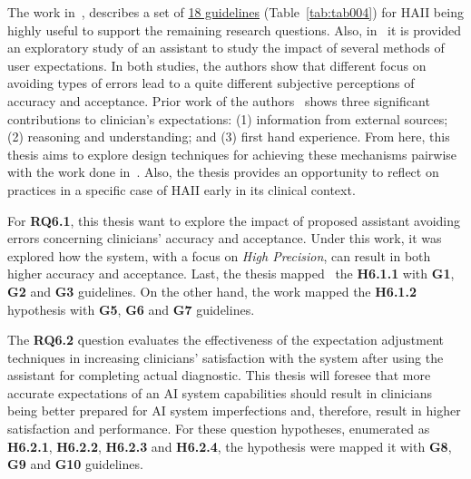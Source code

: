 The work in~\cite{10.1145/3290605.3300233}, describes a set of \underline{18 guidelines} (Table~\ref{tab:tab004}) for \ac{HAII} being highly useful to support the remaining research questions.
Also, in~\cite{Kocielnik:2019:YAI:3290605.3300641} it is provided  an exploratory study of an assistant to study the impact of several methods of user expectations.
In both studies, the authors show that different focus on avoiding types of errors lead to a quite different subjective perceptions of accuracy and acceptance.
Prior work of the authors~\cite{Kocielnik:2019:YAI:3290605.3300641} shows three significant contributions to clinician's expectations:
(1) information from external sources;
(2) reasoning and understanding; and
(3) first hand experience.
From here, this thesis aims to explore design techniques for achieving these mechanisms pairwise with the work done in~\cite{10.1145/3290605.3300233}.
Also, the thesis provides an opportunity to reflect on practices in a specific case of \ac{HAII} early in its clinical context.



For {\bf RQ6.1}, this thesis want to explore the impact of proposed assistant avoiding errors concerning clinicians' accuracy and acceptance.
Under this work, it was explored how the system, with a focus on {\it High Precision}, can result in both higher accuracy and acceptance.
Last, the thesis mapped~\cite{10.1145/3290605.3300233} the {\bf H6.1.1} with {\bf G1}, {\bf G2} and {\bf G3} guidelines.
On the other hand, the work mapped the {\bf H6.1.2} hypothesis with {\bf G5}, {\bf G6} and {\bf G7} guidelines.

The {\bf RQ6.2} question evaluates the effectiveness of the expectation adjustment techniques in increasing clinicians' satisfaction with the system after using the assistant for completing actual diagnostic.
This thesis will foresee that more accurate expectations of an \ac{AI} system capabilities should result in clinicians being better prepared for \ac{AI} system imperfections and, therefore, result in higher satisfaction and performance.
For these question hypotheses, enumerated as {\bf H6.2.1}, {\bf H6.2.2}, {\bf H6.2.3} and {\bf H6.2.4}, the hypothesis were mapped it with {\bf G8}, {\bf G9} and {\bf G10} guidelines.

